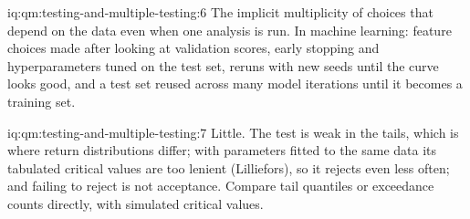 \begin{solution}{iq:qm:testing-and-multiple-testing:6}
The implicit multiplicity of choices that depend on the data even when one analysis is run. In machine learning: feature choices made after
looking at validation scores, early stopping and hyperparameters tuned on the test set, reruns with new seeds until the curve looks good,
and a test set reused across many model iterations until it becomes a training set.
\end{solution}

\begin{solution}{iq:qm:testing-and-multiple-testing:7}
Little. The test is weak in the tails, which is where return distributions differ; with parameters fitted to the same data its
tabulated critical values are too lenient (Lilliefors), so it rejects even less often; and failing to reject is not acceptance. Compare
tail quantiles or exceedance counts directly, with simulated critical values.
\end{solution}

